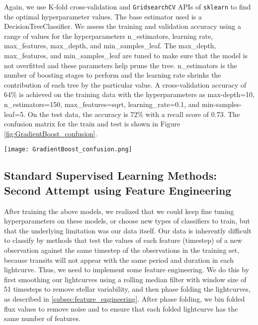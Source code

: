 \documentclass{article}
\begin{document}
Again, we use K-fold cross-validation and \texttt{GridsearchCV} APIs of \texttt{sklearn} to find the optimal hyperparameter values. The base estimator used is a  DecisionTreeClassifier. We assess the training and validation accuracy using a range of values for the hyperparameters n\_estimators, learning rate, max\_features, max\_depth, and min\_samples\_leaf. The max\_depth, max\_features, and min\_samples\_leaf are tuned to make sure that the model is not overfitted and these parameters help prune the tree. n\_estimators is the number of boosting stages to perform and the learning rate shrinks the contribution of each tree by the particular value. A cross-validation accuracy of 64\% is achieved on the training data with the hyperparameters as max-depth=10, n\_estimators=150, max\_features=sqrt, learning\_rate=0.1, and min-samples-leaf=5. On the test data, the accuracy is 72\% with a recall score of 0.73. The confusion matrix for the train and test is shown in Figure \ref{fig:GradientBoost_confusion}.
\begin{figure*}[ht]
\centering
\texttt{[image: GradientBoost\_confusion.png]}
\caption{A confusion matrix for our GradientBoost classifier on the training and test data}
\label{fig:GradientBoost_confusion}
\end{figure*}

\subsection{Standard Supervised Learning Methods: Second Attempt using Feature Engineering}
\label{sec:with_FE}

After training the above models, we realized that we could keep fine tuning hyperparameters on these models, or choose new types of classifiers to train, but that the underlying limitation was our data itself. Our data is inherently difficult to classify by methods that test the values of each feature (timestep) of a new observation against the same timestep of the observations in the training set, because transits will not appear with the same period and duration in each lightcurve. Thus, we need to implement some feature engineering. We do this by first smoothing our lightcurves using a rolling median filter with window size of 51 timesteps to remove stellar variability, and then phase folding the lightcurves, as described in \ref{subsec:feature_engineering}. After phase folding, we bin folded flux values to remove noise and to ensure that each folded lightcurve has the same number of features.
\end{document}
